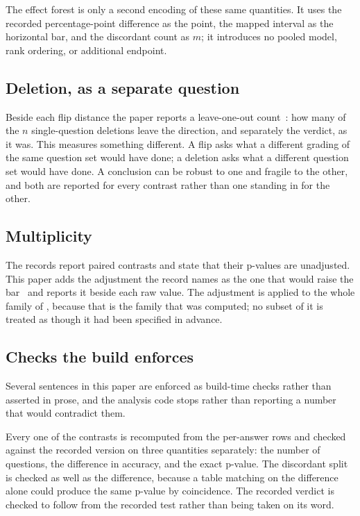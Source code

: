The effect forest is only a second encoding of these same quantities. It uses
the recorded percentage-point difference as the point, the mapped interval as
the horizontal bar, and the discordant count as $m$; it introduces no pooled
model, rank ordering, or additional endpoint.

\subsection{Deletion, as a separate question}

Beside each flip distance the paper reports a leave-one-out
count~\cite{efron1979bootstrap}: how many of the $n$ single-question deletions
leave the direction, and separately the verdict, as it was. This measures
something different. A flip asks what a different grading of the same question
set would have done; a deletion asks what a different question set would have
done. A conclusion can be robust to one and fragile to the other, and both are
reported for every contrast rather than one standing in for the other.

\subsection{Multiplicity}

The records report \Contrasts{} paired contrasts and state that their p-values
are unadjusted. This paper adds the adjustment the record names as the one that
would raise the bar~\cite{holm1979simple} and reports it beside each raw value.
The adjustment is applied to the whole family of \Contrasts{}, because that is
the family that was computed; no subset of it is treated as though it had been
specified in advance.

\subsection{Checks the build enforces}

Several sentences in this paper are enforced as build-time checks rather than
asserted in prose, and the analysis code stops rather than reporting a number
that would contradict them.

Every one of the \Contrasts{} contrasts is recomputed from the per-answer rows
and checked against the recorded version on three quantities separately: the
number of questions, the difference in accuracy, and the exact p-value. The
discordant split is checked as well as the difference, because a table matching
on the difference alone could produce the same p-value by coincidence. The
recorded verdict is checked to follow from the recorded test rather than being
taken on its word.

